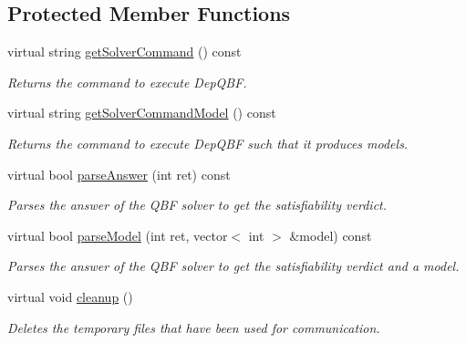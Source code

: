 \subsection*{Protected Member Functions}
\begin{DoxyCompactItemize}
\item 
virtual string \hyperlink{classDepQBFExt_a64f0c17958bd64cfd20a1f2478f68077}{get\-Solver\-Command} () const 
\begin{DoxyCompactList}\small\item\em Returns the command to execute Dep\-Q\-B\-F. \end{DoxyCompactList}\item 
virtual string \hyperlink{classDepQBFExt_a72321fcf85a52333c0f7e83004a3f119}{get\-Solver\-Command\-Model} () const 
\begin{DoxyCompactList}\small\item\em Returns the command to execute Dep\-Q\-B\-F such that it produces models. \end{DoxyCompactList}\item 
virtual bool \hyperlink{classExtQBFSolver_a11ddbf3980824453238071e8a036f804}{parse\-Answer} (int ret) const 
\begin{DoxyCompactList}\small\item\em Parses the answer of the Q\-B\-F solver to get the satisfiability verdict. \end{DoxyCompactList}\item 
virtual bool \hyperlink{classExtQBFSolver_a3b43f437ee9286b62be1de73932b6636}{parse\-Model} (int ret, vector$<$ int $>$ \&model) const 
\begin{DoxyCompactList}\small\item\em Parses the answer of the Q\-B\-F solver to get the satisfiability verdict and a model. \end{DoxyCompactList}\item 
virtual void \hyperlink{classExtQBFSolver_a3ee48837c5e937e4d3a5b3c2a6b761d3}{cleanup} ()
\begin{DoxyCompactList}\small\item\em Deletes the temporary files that have been used for communication. \end{DoxyCompactList}\end{DoxyCompactItemize}
